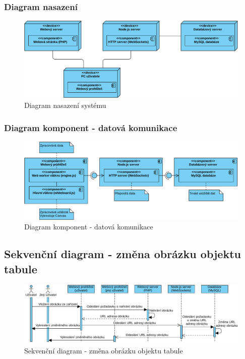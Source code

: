 \subsubsection{Diagram nasazení}
\begin{figure}[h!]
	\centering
	\includegraphics[width=1\textwidth]{Figures/DeploymentDiagram.pdf}
	\caption{Diagram nasazení systému}
	\label{fig:DeploymentDiagram}
\end{figure}


\subsubsection{Diagram komponent - datová komunikace}
\begin{figure}[h!]
	\centering
	\includegraphics[width=1\textwidth]{Figures/ComponentDiagram.pdf}
	\caption{Diagram komponent - datová komunikace}
	\label{fig:ComponentDiagram}
\end{figure}
\clearpage



\subsection{Sekvenční diagram - změna obrázku objektu tabule}
\begin{figure}[h!]
	\centering
	\includegraphics[width=1\textwidth]{Figures/SequenceDiagram1.pdf}
	\caption{Sekvenční diagram - změna obrázku objektu tabule}
	\label{fig:SequenceDiagram1}
\end{figure}
\endinput